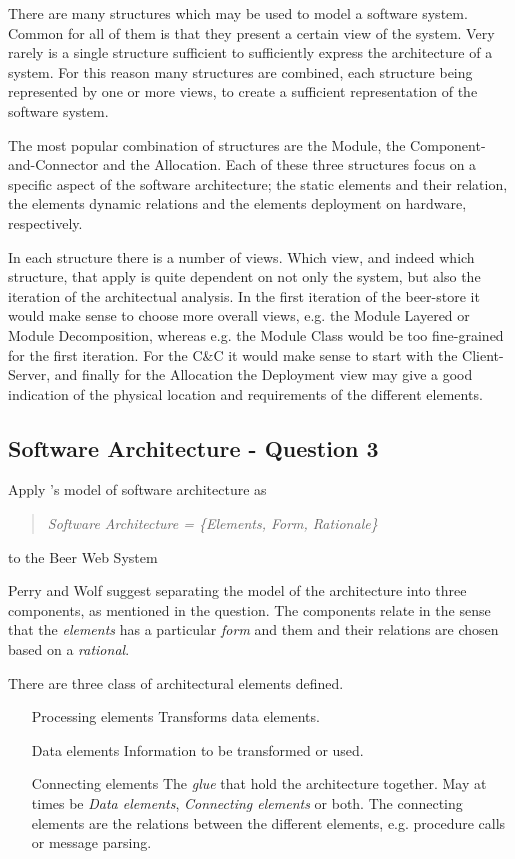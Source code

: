 There are many structures which may be used to model a software system. Common for all of them is that they present a certain view of the system. Very rarely is a single structure sufficient to sufficiently express the architecture of a system. For this reason many structures are combined, each structure being represented by one or more views, to create a sufficient representation of the software system.

The most popular combination of structures are the Module, the Component-and-Connector and the Allocation. Each of these three structures focus on a specific aspect of the software architecture; the static elements and their relation, the elements dynamic relations and the elements deployment on hardware, respectively. 

In each structure there is a number of views. Which view, and indeed which structure, that apply is quite dependent on not only the system, but also the iteration of the architectual analysis. In the first iteration of the beer-store it would make sense to choose more overall views, e.g. the Module Layered or Module Decomposition, whereas e.g. the Module Class would be too fine-grained for the first iteration. For the C\&C it would make sense to start with the Client-Server, and finally for the Allocation the Deployment view may give a good indication of the physical location and requirements of the different elements.

\subsection{Software Architecture - Question 3}

\begin{question}
Apply \cite{perrywolf1992}'s model of software architecture as
\begin{quote}
	{\it Software Architecture = \{Elements, Form, Rationale\}}
\end{quote}
to the Beer Web System
\end{question}

Perry and Wolf suggest separating the model of the architecture into three components, as mentioned in the question. The components relate in the sense that the \emph{elements} has a particular \emph{form} and them and their relations are chosen based on a \emph{rational}.

There are three class of architectural elements defined.
\begin{itemize}
    \item[Processing elements] Transforms data elements.
    \item[Data elements] Information to be transformed or used.
    \item[Connecting elements] The \emph{glue} that hold the architecture together. May at times be \emph{Data elements}, \emph{Connecting elements} or both. The connecting elements are the relations between the different elements, e.g. procedure calls or message parsing.
\end{itemize}

